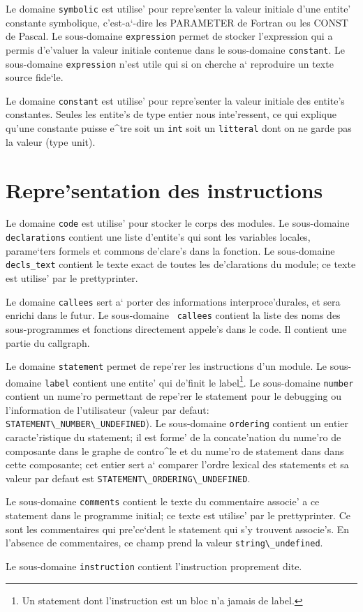 {
Le domaine \verb/symbolic/ est utilise' pour repre'senter la valeur
initiale d'une entite' constante symbolique, c'est-a`-dire les PARAMETER
de Fortran ou les CONST de Pascal. Le sous-domaine \verb/expression/
permet de stocker l'expression qui a permis d'e'valuer la valeur
initiale contenue dans le sous-domaine \verb/constant/. Le sous-domaine
\verb/expression/ n'est utile qui si on cherche a` reproduire un texte
source fide`le.
}

{
Le domaine \verb/constant/ est utilise' pour repre'senter la valeur
initiale des entite's constantes. Seules les entite's de type entier
nous inte'ressent, ce qui explique qu'une constante puisse e^tre soit un
\verb/int/ soit un \verb/litteral/ dont on ne garde pas la valeur (type unit).
}

\section{Repre'sentation des instructions}
\label{code}

{ 
Le domaine \verb/code/ est utilise'
pour stocker le corps des modules. Le sous-domaine \verb/declarations/
contient une liste d'entite's qui sont les variables locales,
parame`ters formels et commons de'clare's dans la fonction. Le
sous-domaine {\tt decls\_text} contient le texte exact de toutes les
de'clarations du module; ce texte est utilise' par le prettyprinter.
}

{ Le domaine {\tt callees} sert a` porter des informations
interproce'durales, et sera enrichi dans le futur.  Le sous-domaine {\tt
callees} contient la liste des noms des sous-programmes et fonctions
directement appele's dans le code. Il contient une partie du callgraph.
}

{ 
Le
domaine \verb/statement/ permet de repe'rer les instructions d'un
module.  Le sous-domaine \verb/label/ contient une entite' qui de'finit
le label\footnote{Un statement dont l'instruction est un bloc n'a
jamais de label.}.
  Le sous-domaine \verb/number/ contient un nume'ro permettant
de repe'rer le statement pour le debugging ou l'information de
l'utilisateur (valeur par defaut: \verb+STATEMENT\_NUMBER\_UNDEFINED+). Le sous-domaine \verb/ordering/ contient un entier
caracte'ristique du statement; il est forme' de la concate'nation du
nume'ro de composante dans le graphe de contro^le et du nume'ro de
statement dans dans cette composante; cet entier sert a` comparer
l'ordre lexical des statements et sa valeur par defaut est \verb+STATEMENT\_ORDERING\_UNDEFINED+. 

Le sous-domaine {\tt comments} contient le texte du commentaire associe'
a ce statement dans le programme initial; ce texte est utilise' par le
prettyprinter. Ce sont les commentaires qui pre'ce`dent le statement
qui s'y trouvent associe's. En l'absence de commentaires, ce champ
prend la valeur \verb/string\_undefined/.

Le sous-domaine \verb/instruction/ contient
l'instruction proprement dite.
}


